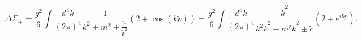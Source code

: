 \begin{equation}
 \Delta\Sigma_\pm = \frac{g^2}6\int 
\frac{d^4k}{(2\pi)^4} \frac1{k^2+m^2
 \pm\frac{\tilde c}{\tilde k^2}}(2+\cos(k\tilde p)) 
 =\frac{g^2}6\int \frac{d^4k}{(2\pi)^4} \frac{\tilde k^2}
 {k^2\tilde k^2 +m^2\tilde k^2 \pm \tilde c}(2+e^{ik\tilde p}).
\label{resloop}
\end{equation}


